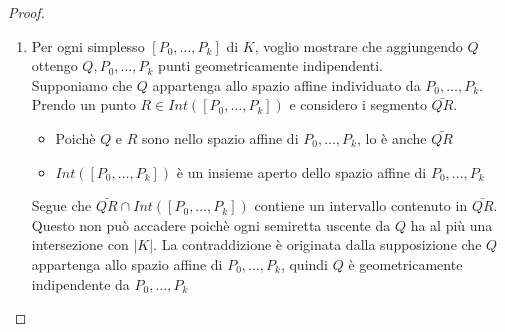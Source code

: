 \documentclass[a4paper]{report}
\begin{document}
\begin{proof}
    \begin{enumerate}
        \item Per ogni simplesso $[P_0,\dots,P_k]$ di $K$, voglio mostrare che aggiungendo $Q$ ottengo $Q,P_0,\dots,P_k$ punti geometricamente indipendenti.\\
              Supponiamo che $Q$ appartenga allo spazio affine individuato da $P_0,\dots,P_k$. Prendo un punto $R\in Int([P_0,\dots,P_k])$ e considero i  segmento $\bar{QR}$.
              \begin{itemize}
                  \item Poichè $Q$ e $R$ sono nello spazio affine di $P_0,\dots,P_k$, lo è anche $\bar{QR}$
                  \item $Int([P_0,\dots,P_k])$ è un insieme aperto dello spazio affine di $P_0,\dots,P_k$
              \end{itemize}
              Segue che $\bar{QR}\cap Int([P_0,\dots,P_k])$ contiene un intervallo contenuto in $\bar{QR}$.\\
              Questo non può accadere poichè ogni semiretta uscente da $Q$ ha al più una intersezione con $|K|$. La contraddizione è originata dalla supposizione che $Q$ appartenga allo spazio affine di $P_0,\dots,P_k$, quindi $Q$ è geometricamente indipendente da $P_0,\dots,P_k$
              \begin{center}



                  \begin{tikzpicture}[x=0.75pt,y=0.75pt,yscale=-1,xscale=1]


\end{tikzpicture}
\end{center}
\end{enumerate}
\end{proof}
\end{document}
